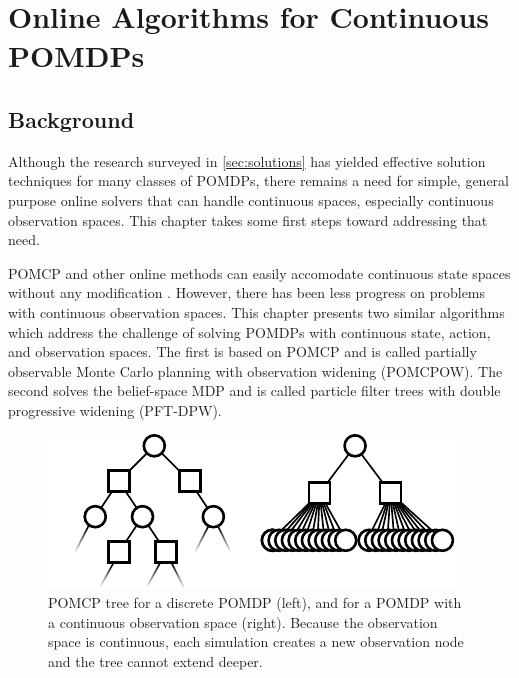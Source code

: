 \chapter{Online Algorithms for Continuous POMDPs}

\section{Background}

Although the research surveyed in \cref{sec:solutions} has yielded effective solution techniques for many classes of POMDPs, there remains a need for simple, general purpose online solvers that can handle continuous spaces, especially continuous observation spaces.
This chapter takes some first steps toward addressing that need.

POMCP and other online methods can easily accomodate continuous state spaces without any modification \cite{goldhoorn2014continuous}.
However, there has been less progress on problems with continuous observation spaces.
This chapter presents two similar algorithms which address the challenge of solving POMDPs with continuous state, action, and observation spaces.
The first is based on POMCP and is called partially observable Monte Carlo planning with observation widening (POMCPOW). 
The second solves the belief-space MDP and is called particle filter trees with double progressive widening (PFT-DPW).

\begin{figure}[htb]
\begin{center}
    \includegraphics[width=0.9\columnwidth]{media/continuous_tree.pdf}
\end{center}
\caption[POMCP tree on a continuous observation space]{POMCP tree for a discrete POMDP (left), and for a POMDP with a continuous observation space (right). Because the observation space is continuous, each simulation creates a new observation node and the tree cannot extend deeper.}
\label{fig:ctree}
\end{figure}


